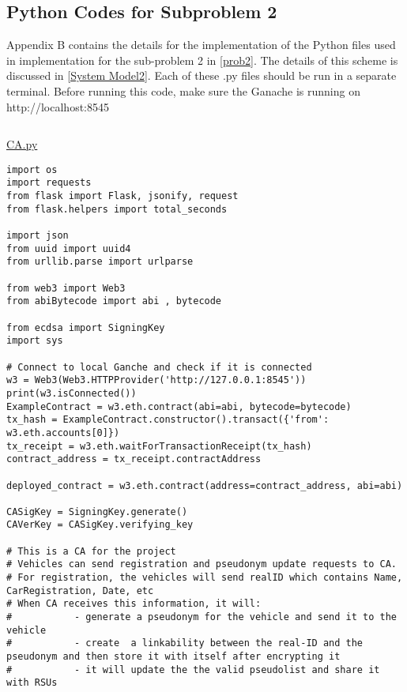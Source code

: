 \newpage
\subsection{Python Codes for Subproblem 2}\label{implementation_2}


Appendix B contains the details for the implementation of the Python files used in implementation for the sub-problem 2 in \ref{prob2}. The details of this scheme is discussed in \ref{System Model2}. Each of these .py files should be run in a separate terminal. Before running this code, make sure the Ganache is running on http://localhost:8545 
\par

\begin{linenumbers}
\begin{lstlisting}

\end{lstlisting}
\resetlinenumber[1]
\hypertarget{milp_code}{}
\hyperlink{milp_text}{CA.py}
\begin{lstlisting}
import os
import requests
from flask import Flask, jsonify, request
from flask.helpers import total_seconds

import json
from uuid import uuid4
from urllib.parse import urlparse

from web3 import Web3
from abiBytecode import abi , bytecode

from ecdsa import SigningKey
import sys

# Connect to local Ganche and check if it is connected
w3 = Web3(Web3.HTTPProvider('http://127.0.0.1:8545'))
print(w3.isConnected())
ExampleContract = w3.eth.contract(abi=abi, bytecode=bytecode)
tx_hash = ExampleContract.constructor().transact({'from': w3.eth.accounts[0]})
tx_receipt = w3.eth.waitForTransactionReceipt(tx_hash)
contract_address = tx_receipt.contractAddress

deployed_contract = w3.eth.contract(address=contract_address, abi=abi)

CASigKey = SigningKey.generate()
CAVerKey = CASigKey.verifying_key

# This is a CA for the project
# Vehicles can send registration and pseudonym update requests to CA.
# For registration, the vehicles will send realID which contains Name, CarRegistration, Date, etc
# When CA receives this information, it will:
#           - generate a pseudonym for the vehicle and send it to the vehicle
#           - create  a linkability between the real-ID and the pseudonym and then store it with itself after encrypting it
#           - it will update the the valid pseudolist and share it with RSUs


\end{lstlisting}
\end{linenumbers}
